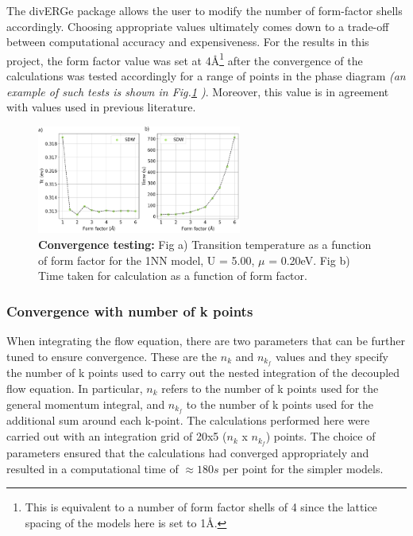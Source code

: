 \documentclass[12pt]{article}
\begin{document}
\medskip


\noindent The divERGe package allows the user to modify the number of form-factor shells accordingly. Choosing appropriate values ultimately comes down to a trade-off 
between computational accuracy and expensiveness. 
For the results in this project, the form factor value was set at 4\AA\footnote{This is equivalent to a number of form factor shells of 4 since the lattice spacing of the models here is set to 1\AA.} after the convergence of  
the calculations was tested accordingly for a range of points in the phase diagram \textit{(an example of such tests is shown in Fig.\ref{fig:Formfactorconvergence} )}. Moreover, this value is in agreement with values used in previous literature\cite{lichtenstein2018functional}. 

\begin{figure}[htbp]  %
    \centering
    \includegraphics[width=0.6\textwidth]{convergence.png}  %
    \caption{\textbf{Convergence testing:} Fig a) Transition temperature as a function of form factor for the 1NN model, U = 5.00, $\mu$ = 0.20eV. Fig b) Time taken for calculation
    as a function of form factor.   }
    \label{fig:Formfactorconvergence}
\end{figure}







\subsubsection{Convergence with number of k points }

When integrating the flow equation, there are two parameters that can be further tuned to ensure convergence.
These are the $n_k$ and $n_{k_f}$ values and they specify the number of k points used to carry out the nested integration of the decoupled flow equation. 
In particular, $n_k$ refers to the number of k points used for the general momentum integral, and $n_{k_f}$ to the number of k points used for 
the additional sum around each k-point. The calculations performed here were carried out with an integration 
grid of 20x5 ($n_k$ x $n_{k_f}$) points. The choice of parameters ensured that the calculations had converged appropriately 
and resulted in a computational time of $\approx 180s$ per point for the simpler models. 
\end{document}
